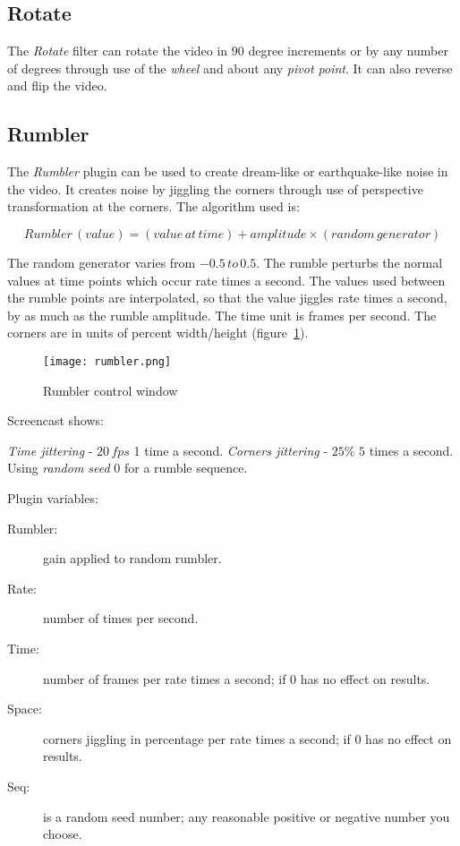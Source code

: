 \subsection{Rotate}%
\label{sub:rotate}

The \textit{Rotate} filter can rotate the video in $90$ degree increments or by any number of degrees through use of the \textit{wheel} and about any \textit{pivot point}. It can also reverse and flip the video.

\subsection{Rumbler}%
\label{sub:rumbler}

The \textit{Rumbler} plugin can be used to create dream-like or earthquake-like noise in the video. It creates noise by jiggling the corners through use of perspective transformation at the corners. The algorithm used is:

\[Rumbler\,(value) = (value\, at\, time) + amplitude \times (random\, generator)\]

The random generator varies from $-0.5\, to\, 0.5$. The rumble perturbs the normal values at time points which occur rate times a second. The values used between the rumble points are interpolated, so that the value jiggles rate times a second, by as much as the rumble amplitude. The time unit is frames per second. The corners are in units of percent width/height (figure~\ref{fig:rumbler}).

\begin{figure}[hbtp]
    \centering
    \texttt{[image: rumbler.png]}
    \caption{Rumbler control window}
    \label{fig:rumbler}
\end{figure}

Screencast shows:

\textit{Time jittering} - $20\, fps$ 1 time a second.
\textit{Corners jittering} - $25\%$  $5$ times a second.
Using \textit{random seed} $0$ for a rumble sequence.

Plugin variables:

\begin{description}
    \item[Rumbler:] gain applied to random rumbler.
    \item[Rate:] number of times per second.
    \item[Time:] number of frames per rate times a second; if 0 has no effect on results.
    \item[Space:] corners jiggling in percentage per rate times a second; if 0 has no effect on results.
    \item[Seq:] is a random seed number; any reasonable positive or negative number you choose.
\end{description}

